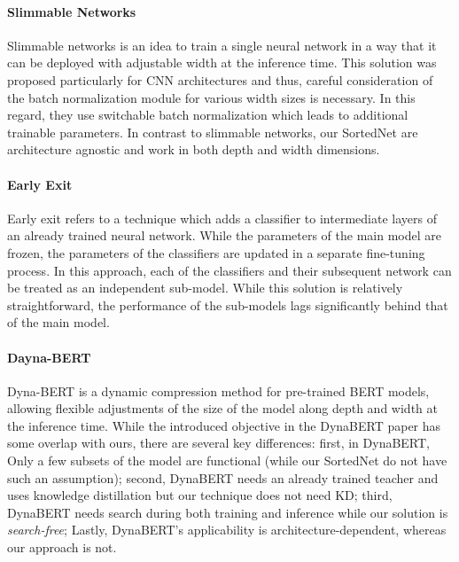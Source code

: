 \documentclass[letterpaper]{article} %
\newcommand\moji[1]{\textcolor{red}{#1}}
\begin{document}
\paragraph{ Slimmable Networks~\cite{yu_slimmable_2018}}
Slimmable networks is an idea to train a single neural network in a way that it can be deployed with adjustable width at the inference time. This solution was proposed particularly for CNN architectures and thus, careful consideration of the batch normalization module for various width sizes is necessary. In this regard, they use switchable batch normalization which leads to additional trainable parameters. In contrast to slimmable networks, our SortedNet are architecture agnostic and work in both depth and width dimensions. 

\paragraph{Early Exit~\cite{xin2020deebert}} Early exit refers to a technique which adds a classifier to intermediate layers of an already trained neural network. While the parameters of the main model are frozen, the parameters of the classifiers are updated in a separate fine-tuning process. In this approach, each of the classifiers and their subsequent network can be treated as an independent sub-model. While this solution is relatively straightforward, the performance of the sub-models lags significantly behind that of the main model.

\paragraph{Dayna-BERT~\cite{hou2020dynabert}}
Dyna-BERT is a dynamic compression method for pre-trained BERT models, allowing flexible adjustments of the size of the model along depth and width at the inference time. While the introduced objective in the DynaBERT paper has some overlap with ours, there are several key differences: first, in DynaBERT,  Only a few subsets of the model are functional (while our SortedNet do not have such an assumption); second, DynaBERT needs an already trained teacher and uses knowledge distillation but our technique does not need KD; third, DynaBERT needs search during both training and inference while our solution is \textit{search-free}; Lastly, DynaBERT's applicability is architecture-dependent, whereas our approach is not.
\end{document}
